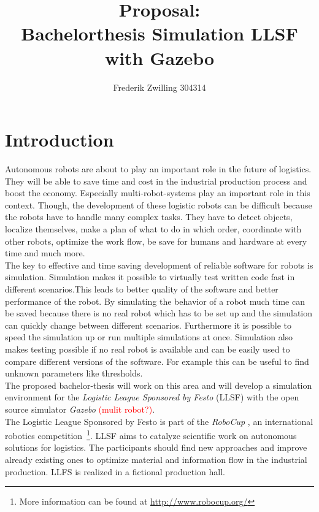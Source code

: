 \documentclass[11pt,a4paper,titlepage]{article}
\author{Frederik Zwilling 304314}
\title{Proposal:\\ Bachelorthesis Simulation LLSF with Gazebo}
\begin{document}
\maketitle
\thispagestyle{empty}
\tableofcontents
\newpage
\onehalfspace

\section{Introduction}
Autonomous robots are about to play an important role in the future of logistics. They will be able to save time and cost in the industrial production process and boost the economy. Especially multi-robot-systems play an important role in this context. Though, the development of these logistic robots can be difficult because the robots have to handle many complex tasks. They have to detect objects, localize themselves, make a plan of what to do in which order, coordinate with other robots, optimize the work flow, be save for humans and hardware at every time and much more.\\
The key to effective and time saving development of reliable software for robots is simulation. Simulation makes it possible to virtually test written code fast in different scenarios.This leads to better quality of the software and better performance of the robot. By simulating the behavior of a robot much time can be saved because there is no real robot which has to be set up and the simulation can quickly change between different scenarios. Furthermore it is possible to speed the simulation up or run multiple simulations at once. Simulation also makes testing possible if no real robot is available and can be easily used to compare different versions of the software. For example this can be useful to find unknown parameters like thresholds.\\
The proposed bachelor-thesis will work on this area and will develop a simulation environment for the \textit{Logistic League Sponsored by Festo} (LLSF) with the open source simulator \textit{Gazebo} \textcolor{red}{(mulit robot?)}.\\
The Logistic League Sponsored by Festo is part of the \textit{RoboCup
}, an international robotics competition~\footnote{More information can be found at \url{http://www.robocup.org/}}. LLSF aims to catalyze scientific work on autonomous solutions for logistics. The participants should find new approaches and improve already existing ones to optimize material and information flow in the industrial production. LLFS is realized in a fictional production hall. 
\end{document}
